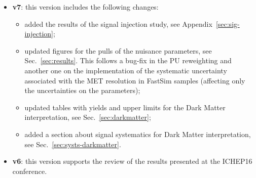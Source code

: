\begin{itemize}
\item \textbf{v7}: this version includes the following changes:
  \begin{itemize}
  \item added the results of the signal injection study, see Appendix~\ref{sec:sig-injection};
  \item updated figures for the pulls of the nuisance parameters, see Sec.~\ref{sec:results}. This follows a bug-fix in the PU reweighting and another one on the implementation 
    of the systematic uncertainty associated with the MET resolution in FastSim samples (affecting only the uncertainties on the parameters);
  \item updated tables with yields and upper limits for the Dark Matter interpretation, see Sec.~\ref{sec:darkmatter};
  \item added a section about signal systematics for Dark Matter interpretation, see Sec.~\ref{sec:systs-darkmatter}.
\end{itemize}
\item \textbf{v6}: this version supports the review of the results presented at the ICHEP16 conference.
\end{itemize}

